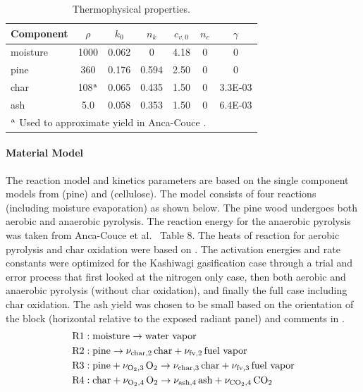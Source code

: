 \begin{table}[h]
\begin{center}
\caption{Thermophysical properties.}
\small
\renewcommand{\arraystretch}{1.2}
\begin{tabular}{lcccccc}
\hline
Component& $\rho$ & $k_{0}$ & $n_k$ & $c_{v,0}$ & $n_c$ & $\gamma$ \\
\hline
moisture & 1000                         & 0.062 & 0     & 4.18 & 0 & 0       \\
pine     & 360                          & 0.176 & 0.594 & 2.50 & 0 & 0       \\
char     & 108$^{\mbox{\scriptsize a}}$ & 0.065 & 0.435 & 1.50 & 0 & 3.3E-03 \\
ash      & 5.0                          & 0.058 & 0.353 & 1.50 & 0 & 6.4E-03 \\
\hline
\multicolumn{7}{l}{$^{\mbox{\scriptsize a}}$ Used to approximate yield in Anca-Couce \cite{Anca-Couce:2012}.}
\end{tabular}
\label{tab:thermophysical_props}
\end{center}
\end{table}

\paragraph{Material Model}

The reaction model and kinetics parameters are based on the single component models from \cite{Anca-Couce:2012} (pine) and \cite{Kashiwagi:CF1992} (cellulose).  The model consists of four reactions (including moisture evaporation) as shown below.  The pine wood undergoes both aerobic and anaerobic pyrolysis.  The reaction energy for the anaerobic pyrolysis was taken from Anca-Couce et al.~\cite{Anca-Couce:2012} Table 8.  The heats of reaction for aerobic pyrolysis and char oxidation were based on \cite{Kashiwagi:CF1992}.  The activation energies and rate constants were optimized for the Kashiwagi gasification case \cite{Kashiwagi:1987} through a trial and error process that first looked at the nitrogen only case, then both aerobic and anaerobic pyrolysis (without char oxidation), and finally the full case including char oxidation.  The ash yield was chosen to be small based on the orientation of the block (horizontal relative to the exposed radiant panel) and comments in \cite{Kashiwagi:1987}.
\begin{align}
\mathrm{R1} &: \mbox{moisture} \rightarrow \mbox{water vapor} \\
\mathrm{R2} &: \mbox{pine} \rightarrow \nu_{\rm char,2} \,\mbox{char} + \nu_{\rm fv,2} \,\mbox{fuel vapor} \\
\mathrm{R3} &: \mbox{pine} + \nu_{{\rm O}_2,3} \, {\rm O}_2 \rightarrow \nu_{\rm char,3} \,\mbox{char} + \nu_{\rm fv,3} \,\mbox{fuel vapor} \\
\mathrm{R4} &: \mbox{char} + \nu_{{\rm O}_2,4}\,{\rm O}_2 \rightarrow \nu_{\rm ash,4} \,\mbox{ash} + \nu_{{\rm C}{\rm O}_2,4} \,{\rm C}{\rm O}_2
\end{align}

